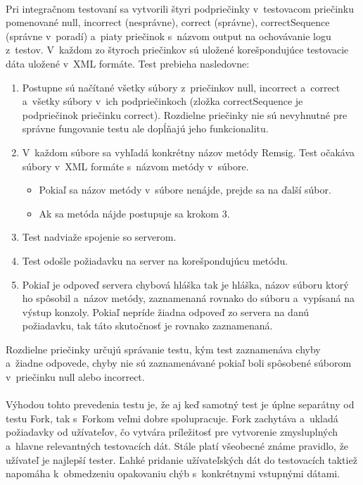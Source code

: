 \documentclass[
  digital, %
  table,   %
oneside,
  nolof,     %
  nolot,     %
]{fithesis3}
\begin{document}
 \paragraph{}
Pri integračnom testovaní sa  vytvorili štyri podpriečinky  v~testovacom priečinku pomenované null, incorrect (nesprávne), correct (správne), correctSequence (správne v~poradí) a~piaty priečinok s~názvom output na ochovávanie logu z~testov. V~každom zo štyroch priečinkov sú uložené korešpondujúce testovacie dáta uložené v~XML formáte. Test prebieha nasledovne: 
\begin{enumerate}
	\item Postupne sú načítané všetky súbory z~priečinkov null, incorrect a~correct a~všetky súbory v~ich podpriečinkoch (zložka correctSequence je podpriečinok priečinku correct). Rozdielne priečinky nie sú nevyhnutné pre správne fungovanie testu ale dopĺňajú jeho funkcionalitu. 
	\item V~každom súbore sa vyhľadá konkrétny názov metódy Remsig. Test očakáva súbory v~XML formáte s~názvom metódy v~súbore.
	\begin{itemize}
		\item Pokiaľ sa názov metódy v~súbore nenájde, prejde sa na ďalší súbor.
		\item Ak sa metóda nájde postupuje sa krokom 3.
	\end{itemize}
	\item Test nadviaže spojenie so serverom.
	\item Test odošle požiadavku na server na korešpondujúcu metódu.
	\item Pokiaľ je odpoveď servera chybová hláška  tak je hláška, názov súboru ktorý ho spôsobil a~názov metódy, zaznamenaná rovnako do súboru a~vypísaná na výstup konzoly. Pokiaľ nepríde žiadna odpoveď zo servera na danú požiadavku, tak táto skutočnosť je rovnako zaznamenaná.  

\end{enumerate}
Rozdielne priečinky určujú správanie testu, kým test zaznamenáva chyby a~žiadne odpovede, chyby nie sú zaznamenávané pokiaľ boli spôsobené súborom v~priečinku null alebo incorrect.
\paragraph{}
Výhodou tohto prevedenia testu je, že aj keď samotný test je úplne separátny od testu Fork, tak s~Forkom veľmi dobre spolupracuje. Fork zachytáva a~ukladá požiadavky od užívateľov, čo vytvára príležitosť pre vytvorenie zmysluplných a~hlavne relevantných testovacích dát. Stále platí všeobecné známe pravidlo, že užívateľ je najlepší tester. Ľahké pridanie užívateľských dát do testovacích taktiež napomáha k~obmedzeniu opakovaniu chýb s~konkrétnymi vstupnými dátami.      
\end{document}
